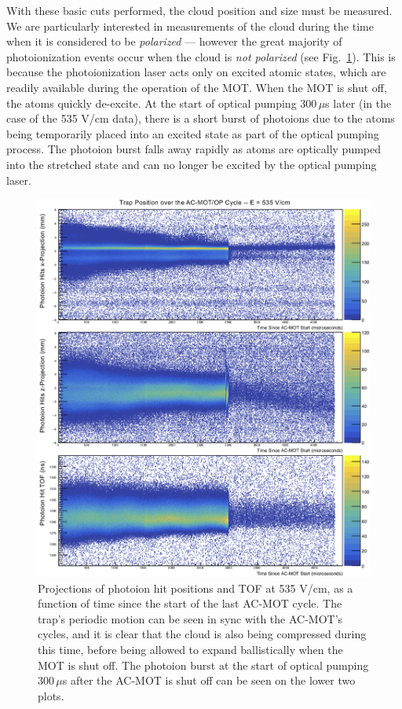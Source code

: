 With these basic cuts performed, the cloud position and size must be measured.  We are particularly interested in measurements of the cloud during the time when it is considered to be \emph{polarized} --- however the great majority of photoionization events occur when the cloud is \emph{not polarized} (see Fig.~\ref{fig:position_v_acmottime_3axes}).  This is because the photoionization laser acts only on excited atomic states, which are readily available during the operation of the \ac{MOT}.  When the \ac{MOT} is shut off, the atoms quickly de-excite.  At the start of optical pumping 300$\,\mu$s later (in the case of the 535 V/cm data), there is a short burst of photoions due to the atoms being temporarily placed into an excited state as part of the optical pumping process.  The photoion burst falls away rapidly as atoms are optically pumped into the stretched state and can no longer be excited by the optical pumping laser.  

\begin{figure}[h!tb]
	\centering
	\includegraphics[width=.999\linewidth]
	{Figures/rMCP_xyz_vs_acmottime.png}
	\caption[Photoion Hit Positions at 535 V/cm, as a function of AC-MOT Time]{Projections of photoion hit positions and \ac{TOF} at 535 V/cm, as a function of time since the start of the last \ac{AC-MOT} cycle.  The trap's periodic motion can be seen in sync with the \ac{AC-MOT}'s cycles, and it is clear that the cloud is also being compressed during this time, before being allowed to expand ballistically when the MOT is shut off.  The photoion burst at the start of optical pumping 300$\,\mu$s after the AC-MOT is shut off can be seen on the lower two plots. 	}	
	\label{fig:position_v_acmottime_3axes}
\end{figure}

